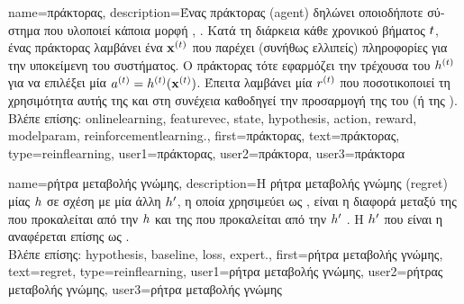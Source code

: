 {name={\foreignlanguage{greek}{πράκτορας}},
	description={\foreignlanguage{greek}{Ένας πράκτορας} (agent) \foreignlanguage{greek}{δηλώνει 
		οποιοδήποτε σύστημα που υλοποιεί κάποια μορφή}  \cite{SuttonEd2}, \cite{RusselNorvig}. 
		\foreignlanguage{greek}{Κατά τη διάρκεια κάθε χρονικού βήματος $t$, ένας πράκτορας λαμβάνει ένα}  
		${\bf x}^{(t)}$ \foreignlanguage{greek}{που παρέχει (συνήθως ελλιπείς) πληροφορίες για την υποκείμενη}  
		\foreignlanguage{greek}{του συστήματος. Ο πράκτορας τότε εφαρμόζει την τρέχουσα}  
		\foreignlanguage{greek}{του $h^{(t)}$ για να επιλέξει μία}  
		$a^{(t)}=h^{(t)}({\bf x}^{(t)})$. \foreignlanguage{greek}{Έπειτα λαμβάνει μία}
		 $r^{(t)}$ \foreignlanguage{greek}{που ποσοτικοποιεί τη χρησιμότητα αυτής της}  
		\foreignlanguage{greek}{και στη συνέχεια καθοδηγεί την προσαρμογή της}  \foreignlanguage{greek}{του (ή της} 
		). 
		\\ 
		\foreignlanguage{greek}{Βλέπε επίσης:} \gls{onlinelearning}, \gls{featurevec}, \gls{state}, \gls{hypothesis}, \gls{action}, \gls{reward}, 
		\gls{modelparam}, \gls{reinforcementlearning}.},
	first={\foreignlanguage{greek}{πράκτορας}},
	text={\foreignlanguage{greek}{πράκτορας}},
	type=reinflearning, 
	user1={\foreignlanguage{greek}{πράκτορας}}, %
  	user2={\foreignlanguage{greek}{πράκτορα}}, %
	user3={\foreignlanguage{greek}{πράκτορα}} %
}

{name={\foreignlanguage{greek}{ρήτρα μεταβολής γνώμης}},
	description={\foreignlanguage{greek}{Η ρήτρα μεταβολής γνώμης} 
		(regret) \foreignlanguage{greek}{μίας} 
		 $h$ \foreignlanguage{greek}{σε σχέση με μία άλλη}  
		 $h'$, \foreignlanguage{greek}{η οποία χρησιμεύει 
		ως} , \foreignlanguage{greek}{είναι η διαφορά μεταξύ της}
		 \foreignlanguage{greek}{που προκαλείται από την $h$ 
		και της}  \foreignlanguage{greek}{που προκαλείται από την}
		$h'$ \cite{PredictionLearningGames}. \foreignlanguage{greek}{Η} 
		 $h'$ \foreignlanguage{greek}{που είναι η} 
		 \foreignlanguage{greek}{αναφέρεται επίσης ως} .
					\\ 
		\foreignlanguage{greek}{Βλέπε επίσης:} \gls{hypothesis}, \gls{baseline}, \gls{loss}, \gls{expert}.},
	first={\foreignlanguage{greek}{ρήτρα μεταβολής γνώμης}},
	text={regret},
	type=reinflearning,
	user1={\foreignlanguage{greek}{ρήτρα μεταβολής γνώμης}}, %
  	user2={\foreignlanguage{greek}{ρήτρας μεταβολής γνώμης}}, %
	user3={\foreignlanguage{greek}{ρήτρα μεταβολής γνώμης}} %
}

